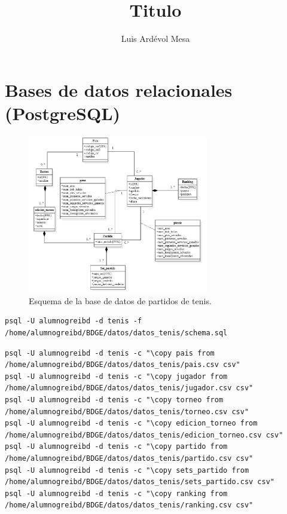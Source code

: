 \documentclass[10pt]{opticajnl}
\title{Titulo}
\author[1,2,3]{Luis Ardévol Mesa}
\begin{document}
\maketitle

\section{Bases de datos relacionales (PostgreSQL)}

\begin{figure}[H]
  \centering
  \includegraphics[width=0.7\textwidth]{fotos/esquema.png}
  \caption{Esquema de la base de datos de partidos de tenis.}
  \label{fig:schbd}
\end{figure}

\begin{lstlisting}[style=terminal]
psql -U alumnogreibd -d tenis -f /home/alumnogreibd/BDGE/datos/datos_tenis/schema.sql
\end{lstlisting}

\begin{lstlisting}[style=terminal]
psql -U alumnogreibd -d tenis -c "\copy pais from /home/alumnogreibd/BDGE/datos/datos_tenis/pais.csv csv"
psql -U alumnogreibd -d tenis -c "\copy jugador from /home/alumnogreibd/BDGE/datos/datos_tenis/jugador.csv csv"
psql -U alumnogreibd -d tenis -c "\copy torneo from /home/alumnogreibd/BDGE/datos/datos_tenis/torneo.csv csv"
psql -U alumnogreibd -d tenis -c "\copy edicion_torneo from /home/alumnogreibd/BDGE/datos/datos_tenis/edicion_torneo.csv csv"
psql -U alumnogreibd -d tenis -c "\copy partido from /home/alumnogreibd/BDGE/datos/datos_tenis/partido.csv csv"
psql -U alumnogreibd -d tenis -c "\copy sets_partido from /home/alumnogreibd/BDGE/datos/datos_tenis/sets_partido.csv csv"
psql -U alumnogreibd -d tenis -c "\copy ranking from /home/alumnogreibd/BDGE/datos/datos_tenis/ranking.csv csv"
\end{lstlisting}
\end{document}
